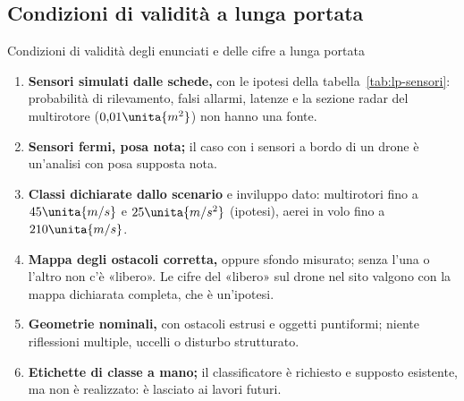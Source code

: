 \subsection{Condizioni di validità a lunga portata}\label{sec:lp-validita}

\begin{riquadro}{Condizioni di validità degli enunciati e delle cifre a lunga portata}
\begin{enumerate}[label=\arabic*.,itemsep=1pt]
\item \textbf{Sensori simulati dalle schede,} con le ipotesi della tabella~\ref{tab:lp-sensori}: probabilità di rilevamento, falsi allarmi, latenze e la sezione radar del multirotore ($0{,}01\unita{m^2}$) non hanno una fonte.
\item \textbf{Sensori fermi, posa nota;} il caso con i sensori a bordo di un drone è un'analisi con posa supposta nota.
\item \textbf{Classi dichiarate dallo scenario} e inviluppo dato: multirotori fino a $45\unita{m/s}$ e $25\unita{m/s^2}$ (ipotesi), aerei in volo fino a $210\unita{m/s}$.
\item \textbf{Mappa degli ostacoli corretta,} oppure sfondo misurato; senza l'una o l'altro non c'è «libero». Le cifre del «libero» sul drone nel sito valgono con la mappa dichiarata completa, che è un'ipotesi.
\item \textbf{Geometrie nominali,} con ostacoli estrusi e oggetti puntiformi; niente riflessioni multiple, uccelli o disturbo strutturato.
\item \textbf{Etichette di classe a mano;} il classificatore è richiesto e supposto esistente, ma non è realizzato: è lasciato ai lavori futuri.
\end{enumerate}
\end{riquadro}
